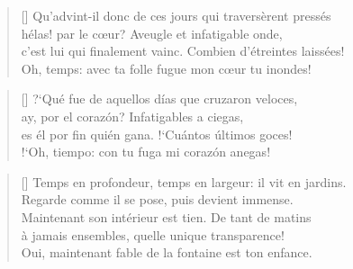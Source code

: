 



\settowidth{\versewidth}{c'est lui qui finalement vainc. Combien d'étreintes laissées!}

\bigskip

\begin{verse}[\versewidth]
Qu'advint-il donc de ces jours qui traversèrent pressés \\
hélas! par le c{\oe}ur? Aveugle et infatigable onde, \\
c'est lui qui finalement vainc. Combien d'étreintes laissées! \\
Oh, temps: avec ta folle fugue mon c{\oe}ur tu inondes! \\
\end{verse}



\settowidth{\versewidth}{es él por fin quién gana. !`Cuántos últimos goces!}

\bigskip

\begin{verse}[\versewidth]
?`Qué fue de aquellos días que cruzaron veloces, \\
ay, por el corazón? Infatigables a ciegas, \\
es él por fin quién gana. !`Cuántos últimos goces! \\
!`Oh, tiempo: con tu fuga mi corazón anegas!
\end{verse}




\settowidth{\versewidth}{Temps en profondeur, temps en largeur: il vit en jardins.}

\bigskip

\begin{verse}[\versewidth]
Temps en profondeur, temps en largeur: il vit en jardins. \\
Regarde comme il se pose, puis devient immense. \\
Maintenant son intérieur est tien. De tant de matins \\
à jamais ensembles, quelle unique transparence! \\
Oui, maintenant fable de la fontaine est ton enfance.
\end{verse}

